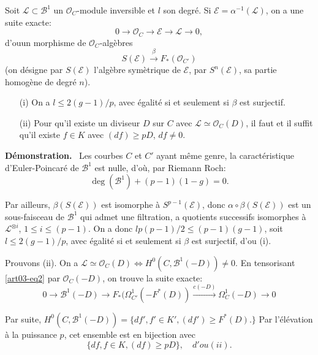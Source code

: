 Soit $\mathscr{L}\subset \mathscr{B}^{1}$ un $\mathscr{O}_{C}$-module
inversible et $l$ son degr\'e. Si
$\mathscr{E}=\alpha^{-1}(\mathscr{L})$, on a une suite exacte:
\begin{equation}
0\to \mathscr{O}_{C}\to \mathscr{E}\to \mathscr{L}\to
0,\label{art03-eq3} 
\end{equation}
d'ou\pageoriginale un morphisme de $\mathscr{O}_{C}$-alg\`ebres
$$
S(\mathscr{E})\xrightarrow{\beta}F_{*}(\mathscr{O}_{C'})
$$
(on d\'esigne par $S(\mathscr{E})$ l'alg\`ebre sym\`etrique de
$\mathscr{E}$, par $S^{n}(\mathscr{E})$, sa partie homog\`ene de
degr\'e $n$).

\begin{prop}\label{art03-prop1}
\begin{itemize}
\item[\rm(i)] On a $l\leq 2(g-1)/p$, avec \'egalit\'e si et seulement
si $\beta$ est surjectif.

\item[\rm(ii)] Pour qu'il existe un diviseur $D$ sur $C$ avec
$\mathscr{L}\simeq \mathscr{O}_{C}(D)$, il faut et il suffit qu'il
existe $f\in K$ avec $(df)\geq pD$, $df\neq 0$.
\end{itemize}
\end{prop}

\noindent
{\bf D\'emonstration.}~
Les courbes $C$ et $C'$ ayant m\^eme genre, la caract\'eristique
d'Euler-Poincar\'e de $\mathscr{B}^{1}$ est nulle, d'o\`u, par Riemann
Roch:
$$
\deg (\mathscr{B}^{1})+(p-1)(1-g)=0.
$$

Par ailleurs, $\beta(S(\mathscr{E}))$ est isomorphe \`a
$S^{p-1}(\mathscr{E})$, donc $\alpha\circ \beta(S(\mathscr{E}))$ est
un sous-faisceau de $\mathscr{B}^{1}$ qui admet une filtration, a
quotients successifs isomorphes \`a $\mathscr{L}^{\otimes i}$, $1\leq
i\leq (p-1)$. On a donc $lp(p-1)/2\leq (p-1)(g-1)$, soit $l\leq
2(g-1)/p$, avec \'egalit\'e si et seulement si $\beta$ est
surjectif, d'ou (i).

Prouvons (ii). On a
$\mathscr{L}\simeq \mathscr{O}_{C}(D)\Leftrightarrow
H^{0}(C,\mathscr{B}^{1}(-D))\neq 0$. En tensorisant \eqref{art03-eq2}
par $\mathscr{O}_{C}(-D)$, on trouve la suite exacte:
$$
0\to \mathscr{B}^{1}(-D)\to
F_{*}(\Omega^{1}_{C'}(-F^{*}(D))\xrightarrow{c(-D)}\Omega^{1}_{C}(-D)\to 0
$$

Par suite, $H^{0}(C,\mathscr{B}^{1}(-D))=\{df',f'\in K',(df')\geq
F^{*}(D).\}$ Par l'\'el\'evation \`a la puissance $p$, cet ensemble
est en bijection avec
$$
\{df, f\in K,(df)\geq pD\},\quad d'ou(ii).
$$

